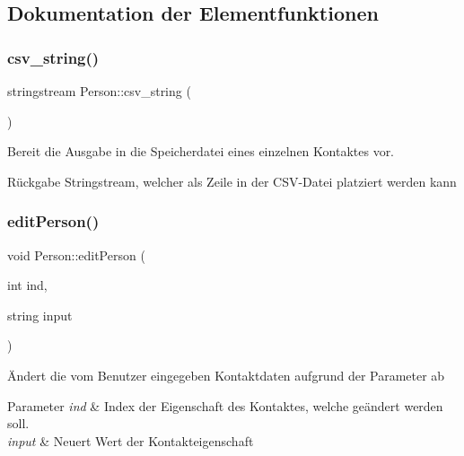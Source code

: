 \subsection{Dokumentation der Elementfunktionen}
\mbox{\label{classContactManager_1_1Person_a3bc1692664e68de81b431caa6a77510b}} 
\subsubsection{\texorpdfstring{csv\+\_\+string()}{csv\_string()}}
{\footnotesize\ttfamily stringstream Person\+::csv\+\_\+string (\begin{DoxyParamCaption}{ }\end{DoxyParamCaption})}



Bereit die Ausgabe in die Speicherdatei eines einzelnen Kontaktes vor.

\begin{DoxyReturn}{Rückgabe}
Stringstream, welcher als Zeile in der C\+S\+V-\/\+Datei platziert werden kann
\end{DoxyReturn}
\mbox{\label{classContactManager_1_1Person_a90d0e64d4db9d19843a343c6f9564555}} 
\subsubsection{\texorpdfstring{edit\+Person()}{editPerson()}}
{\footnotesize\ttfamily void Person\+::edit\+Person (\begin{DoxyParamCaption}\item[{int}]{ind,  }\item[{string}]{input }\end{DoxyParamCaption})}



Ändert die vom Benutzer eingegeben Kontaktdaten aufgrund der Parameter ab


\begin{DoxyParams}{Parameter}
{\em ind} & Index der Eigenschaft des Kontaktes, welche geändert werden soll.\\
\hline
{\em input} & Neuert Wert der Kontakteigenschaft\\
\hline
\end{DoxyParams}
\mbox{\label{classContactManager_1_1Person_a785d2a902e5fb396adf21e3a69718edd}} 
